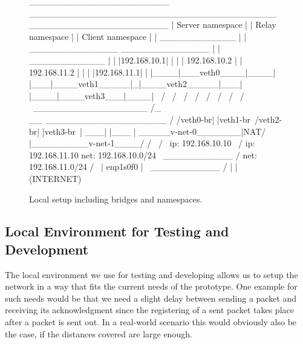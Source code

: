 \vspace{0.5cm}
\begin{figure}[H]
\centering
\begin{myverbatim}
 ______________________         _______________________________________        ______________________
|   Server namespace   |       |            Relay namespace            |      |   Client namespace   |
|     ____________     |       |    ______________   ______________    |      |     ____________     |
|    |192.168.10.1|    |       |   | 192.168.10.2 | | 192.168.11.2 |   |      |    |192.168.11.1|    |
|____|___veth0____|____|       |___|____veth1_____|_|____veth2_____|___|      |____|____veth3___|____|
            \                            /                 \                             /
             \                          /                   \                           /
              \                        /                     \                         /
               \                      /                       \                       /
                \ __________________ /_                      __\ ___________________ /
                /veth0-br|     |veth1-br\                   /veth2-br|      |veth3-br\
                |                    ___|                   |___                     |
                \_____v-net-0_______|NAT/                   \NAT|_________v-net-1____/
                        /              \                     /                \
               ip: 192.168.10.10        \                   /         ip: 192.168.11.10
               net: 192.168.10.0/24      \   ___________   /          net: 192.168.11.0/24
                                           /             \
                                          |   enp1s0f0    |
                                           \ ___________ /
                                                  |
                                                  |
                                              (INTERNET)

\end{myverbatim}
\caption{Local setup including bridges and namespaces.}\label{fig:namespace-setup}
\end{figure}
\vspace{0.5cm}

\subsection{Local Environment for Testing and Development}\label{subsec:namespace_environment}
The local environment we use for testing and developing allows us to setup the network in a way 
that fits the current needs of the prototype.
One example for such needs would be that we need a slight delay between sending a packet and 
receiving its acknowledgment since the registering of a sent packet takes place after a packet 
is sent out. 
In a real-world scenario this would obviously also be the case, if the distances covered 
are large enough.

